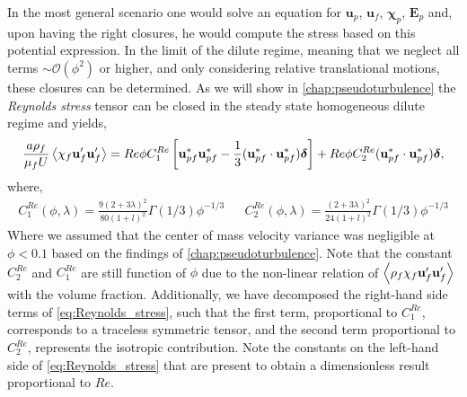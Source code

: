 In the most general scenario one would solve an equation for $\textbf{u}_p$, $\textbf{u}_f$, $\bm\chi_p$, $\textbf{E}_p$ and, upon having the right closures, he would compute the stress based on this potential expression. 
In the limit of the dilute regime, meaning that we neglect all terms $\sim \mathcal{O}(\phi^2)$ or higher, and only considering relative translational motions, these closures can be determined. 
As we will show in \ref{chap:pseudoturbulence} the \textit{Reynolds stress} tensor can be closed in the steady state homogeneous dilute regime and yields, 
\begin{equation}
    \frac{a \rho_f}{\mu_f U}\avg{\chi_f \textbf{u}_f'\textbf{u}'_f}
    = Re  \phi C^{Re}_1 \left[
        \textbf{u}_{pf}^*
        \textbf{u}_{pf}^*
        -\frac{1}{3}
        (\textbf{u}_{pf}^*
        \cdot\textbf{u}_{pf}^*)\bm\delta
    \right]
    + Re \phi C^{Re}_2 (\textbf{u}_{pf}^*\cdot\textbf{u}_{pf}^*) \bm\delta, 
    \label{eq:Reynolds_stress}
\end{equation}
where, 
\begin{align*}
    C^{Re}_1(\phi,\lambda)
    = 
        \frac{9(2+3\lambda)^2}{80(1+l)^2}\Gamma(1/3) \phi^{-1/3}
    && 
    C^{Re}_2(\phi,\lambda)
    = 
        \frac{(2+3\lambda)^2}{24(1+l)^2}\Gamma(1/3) \phi^{-1/3}
\end{align*}
Where we assumed that the center of mass velocity variance was negligible at  $\phi<0.1$ based on the findings of \ref{chap:pseudoturbulence}. 
Note that the constant $C^{Re}_2$ and $C^{Re}_1$ are still function of $\phi$ due to the non-linear relation of $\left<\rho_f\chi_f\textbf{u}_f'\textbf{u}'_f\right>$ with the volume fraction. 
Additionally, we have decomposed the right-hand side terms of \ref{eq:Reynolds_stress}, such that the first term, proportional to $C^{Re}_1$, corresponds to a traceless symmetric tensor, and the second term proportional to $C^{Re}_2$, represents the isotropic contribution.  
Note the constants on the left-hand side of \ref{eq:Reynolds_stress} that are present to obtain a dimensionless result proportional to $Re$. 

